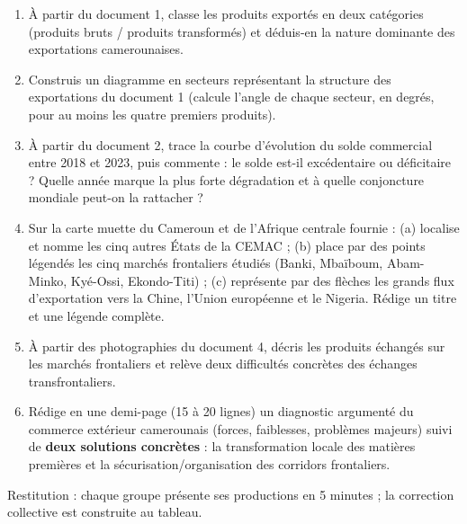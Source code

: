 \documentclass[11pt]{article}
\newcommand{\cle}[1]{{\popxbold\color{popdark}#1}}
\newcounter{popsec}
\newcounter{popsub}
\newcommand{\courssub}[1]{%
  \stepcounter{popsub}%
  \par\vspace{9pt}\noindent{\popxbold\fontsize{11.5}{13}\selectfont\color{popink}{\color{poporange}\thepopsec.\thepopsub}\hspace{6pt}#1}\par\nopagebreak\vspace{4pt}
}
\begin{document}
\begin{enumerate}
\item À partir du document 1, classe les produits exportés en deux catégories (produits bruts / produits transformés) et déduis-en la nature dominante des exportations camerounaises.
\item Construis un diagramme en secteurs représentant la structure des exportations du document 1 (calcule l'angle de chaque secteur, en degrés, pour au moins les quatre premiers produits).
\item À partir du document 2, trace la courbe d'évolution du solde commercial entre 2018 et 2023, puis commente : le solde est-il excédentaire ou déficitaire ? Quelle année marque la plus forte dégradation et à quelle conjoncture mondiale peut-on la rattacher ?
\item Sur la carte muette du Cameroun et de l'Afrique centrale fournie : (a) localise et nomme les cinq autres États de la CEMAC ; (b) place par des points légendés les cinq marchés frontaliers étudiés (Banki, Mbaïboum, Abam-Minko, Kyé-Ossi, Ekondo-Titi) ; (c) représente par des flèches les grands flux d'exportation vers la Chine, l'Union européenne et le Nigeria. Rédige un titre et une légende complète.
\item À partir des photographies du document 4, décris les produits échangés sur les marchés frontaliers et relève deux difficultés concrètes des échanges transfrontaliers.
\item Rédige en une demi-page (15 à 20 lignes) un \cle{diagnostic argumenté} du commerce extérieur camerounais (forces, faiblesses, problèmes majeurs) suivi de \textbf{deux solutions concrètes} : la transformation locale des matières premières et la sécurisation/organisation des corridors frontaliers.
\end{enumerate}

Restitution : chaque groupe présente ses productions en 5 minutes ; la correction collective est construite au tableau.

\courssub{Ressources à mobiliser}
\end{document}
